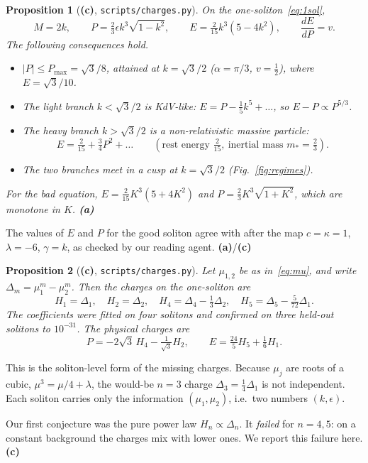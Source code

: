 \documentclass[11pt,a4paper]{article}
\newcommand{\La}{\textsf{\textbf{(a)}}}
\newcommand{\Lc}{\textsf{\textbf{(c)}}}
\newcommand{\script}[1]{\texttt{scripts/#1}}
\newtheorem{proposition}{Proposition}[section]
\theoremstyle{remark}
\begin{document}
\begin{proposition}[\Lc, \script{charges.py}]\label{prop:EP}
On the one-soliton~\eqref{eq:1sol},
\[
M=2k,\qquad P=\tfrac23\epsilon k^3\sqrt{1-k^2},\qquad E=\tfrac2{15}k^3(5-4k^2),\qquad \frac{dE}{dP}=v .
\]
The following consequences hold.
\begin{itemize}
\item $|P|\le P_{\max}=\sqrt3/8$, attained at $k=\sqrt3/2$ ($\alpha=\pi/3$, $v=\frac12$), where $E=\sqrt3/10$.
\item The light branch $k<\sqrt3/2$ is KdV-like: $E=P-\tfrac15k^5+\dots$, so $E-P\propto P^{5/3}$.
\item The heavy branch $k>\sqrt3/2$ is a non-relativistic massive particle:
\[
E=\tfrac2{15}+\tfrac34P^2+\dots\qquad(\text{rest energy }\tfrac{2}{15},\ \text{inertial mass }m_*=\tfrac23).
\]
\item The two branches meet in a cusp at $k=\sqrt3/2$ (Fig.~\ref{fig:regimes}).
\end{itemize}
For the bad equation, $E=\tfrac2{15}K^3(5+4K^2)$ and $P=\tfrac23K^3\sqrt{1+K^2}$, which are monotone in $K$. \La~\cite[(14),(16),(18)]{BC}
\end{proposition}

The values of $E$ and $P$ for the good soliton agree with \cite[(2.9)]{CZ} after the map $c=\kappa=1$, $\lambda=-6$, $\gamma=k$, as checked by our reading agent. \La/\Lc

\begin{proposition}[\Lc, \script{charges.py}]\label{prop:charges}
Let $\mu_{1,2}$ be as in~\eqref{eq:mu}, and write $\Delta_m=\mu_1^m-\mu_2^m$. Then the charges on the one-soliton are
\[
H_1=\Delta_1,\quad H_2=\Delta_2,\quad H_4=\Delta_4-\tfrac13\Delta_2,\quad H_5=\Delta_5-\tfrac5{72}\Delta_1 .
\]
The coefficients were fitted on four solitons and confirmed on three held-out solitons to $10^{-31}$. The physical charges are
\[
P=-2\sqrt3\,H_4-\tfrac{1}{\sqrt3}H_2,\qquad E=\tfrac{24}5H_5+\tfrac16H_1 .
\]
\end{proposition}

This is the soliton-level form of the missing charges. Because $\mu_j$ are roots of a cubic, $\mu^3=\mu/4+\lambda$, the would-be $n=3$ charge $\Delta_3=\frac14\Delta_1$ is not independent. Each soliton carries only the information $(\mu_1,\mu_2)$, i.e.\ two numbers $(k,\epsilon)$.

Our first conjecture was the pure power law $H_n\propto\Delta_n$. It \emph{failed} for $n=4,5$: on a constant background the charges mix with lower ones. We report this failure here. \Lc
\end{document}
